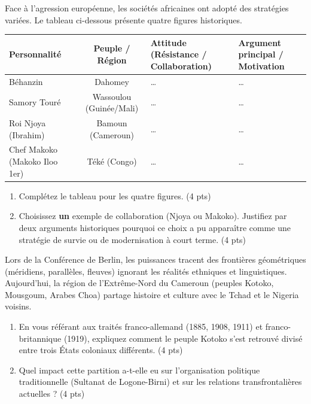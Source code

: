 \documentclass[11pt]{article}
\begin{document}
\begin{exercice}
\noindent Face à l'agression européenne, les sociétés africaines ont adopté des stratégies variées. Le tableau ci-dessous présente quatre figures historiques.

\begin{tabularx}{\linewidth}{|>{\raggedright\arraybackslash}X|c>{\raggedright\arraybackslash}X>{\raggedright\arraybackslash}X|}
\hline
\textbf{Personnalité} & \textbf{Peuple / Région} & \textbf{Attitude (Résistance / Collaboration)} & \textbf{Argument principal / Motivation} \\
\hline
Béhanzin & Dahomey & \dots & \dots \\
\hline
Samory Touré & Wassoulou (Guinée/Mali) & \dots & \dots \\
\hline
Roi Njoya (Ibrahim) & Bamoun (Cameroun) & \dots & \dots \\
\hline
Chef Makoko (Makoko Iloo 1er) & Téké (Congo) & \dots & \dots \\
\hline
\end{tabularx}

\begin{enumerate}
\item Complétez le tableau pour les quatre figures. \hfill (4 pts)
\item Choisissez \textbf{un} exemple de collaboration (Njoya ou Makoko). Justifiez par deux arguments historiques pourquoi ce choix a pu apparaître comme une stratégie de survie ou de modernisation à court terme. \hfill (4 pts)
\end{enumerate}
\end{exercice}

\begin{exercice}
\noindent Lors de la Conférence de Berlin, les puissances tracent des frontières géométriques (méridiens, parallèles, fleuves) ignorant les réalités ethniques et linguistiques. Aujourd'hui, la région de l'Extrême-Nord du Cameroun (peuples Kotoko, Mousgoum, Arabes Choa) partage histoire et culture avec le Tchad et le Nigeria voisins.

\begin{enumerate}
\item En vous référant aux traités franco-allemand (1885, 1908, 1911) et franco-britannique (1919), expliquez comment le peuple Kotoko s'est retrouvé divisé entre trois États coloniaux différents. \hfill (4 pts)
\item Quel impact cette partition a-t-elle eu sur l'organisation politique traditionnelle (Sultanat de Logone-Birni) et sur les relations transfrontalières actuelles ? \hfill (4 pts)
\end{enumerate}
\end{exercice}
\end{document}
